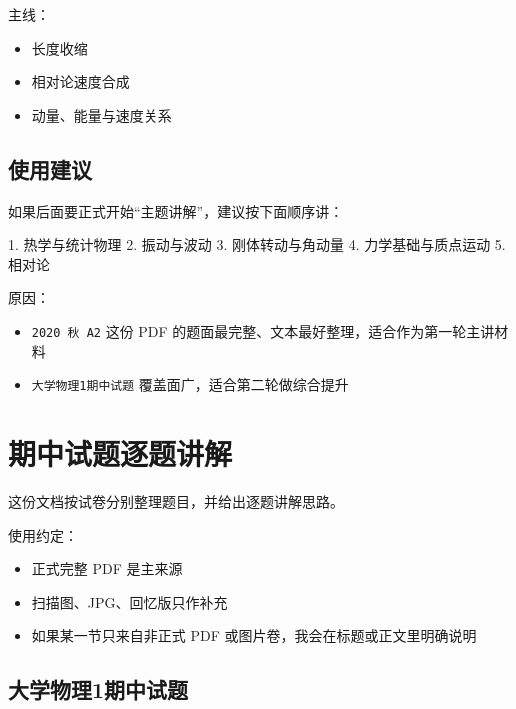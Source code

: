 \documentclass[12pt,a4paper]{ctexart}
\begin{document}
主线：

\begin{itemize}

\item 长度收缩

\item 相对论速度合成

\item 动量、能量与速度关系

\end{itemize}

\subsection{使用建议}

如果后面要正式开始“主题讲解”，建议按下面顺序讲：

1. 热学与统计物理 2. 振动与波动 3. 刚体转动与角动量 4. 力学基础与质点运动 5. 相对论

原因：

\begin{itemize}

\item \texttt{2020 秋 A2} 这份 PDF 的题面最完整、文本最好整理，适合作为第一轮主讲材料

\item \texttt{大学物理1期中试题} 覆盖面广，适合第二轮做综合提升

\end{itemize}


\section{期中试题逐题讲解}

这份文档按试卷分别整理题目，并给出逐题讲解思路。

使用约定：

\begin{itemize}

\item 正式完整 PDF 是主来源

\item 扫描图、JPG、回忆版只作补充

\item 如果某一节只来自非正式 PDF 或图片卷，我会在标题或正文里明确说明

\end{itemize}

\subsection{大学物理1期中试题}
\end{document}
